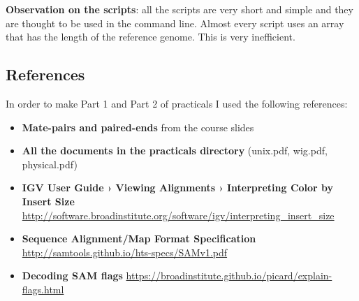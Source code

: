 \begin{enumerate}
\newpage
\textbf{Observation on the scripts}: all the scripts are very short and simple
and they are thought to be used in the command line.
Almost every script uses an array that has the length of the reference genome.
This is very inefficient.

\newpage
\subsection{References}

In order to make Part 1 and Part 2 of practicals I used the following references:

\begin{itemize}
  \item \textbf{Mate-pairs and paired-ends} from the course slides
  \item \textbf{All the documents in the practicals directory} (unix.pdf, wig.pdf, physical.pdf)
  \item \textbf{IGV User Guide › Viewing Alignments › Interpreting Color by Insert Size}
\url{http://software.broadinstitute.org/software/igv/interpreting_insert_size}
  \item \textbf{Sequence Alignment/Map Format Specification} \url{http://samtools.github.io/hts-specs/SAMv1.pdf}
  \item \textbf{Decoding SAM flags} \url{https://broadinstitute.github.io/picard/explain-flags.html}
\end{itemize}

\end{enumerate}
